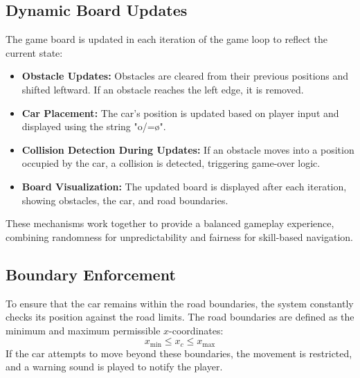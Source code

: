 \documentclass[conference]{IEEEtran}
\begin{document}
\subsection{Dynamic Board Updates}  
The game board is updated in each iteration of the game loop to reflect the current state:  

\begin{itemize}  
    \item \textbf{Obstacle Updates:} Obstacles are cleared from their previous positions and shifted leftward. If an obstacle reaches the left edge, it is removed.  
    \item \textbf{Car Placement:} The car's position is updated based on player input and displayed using the string "o/=\o".  
    \item \textbf{Collision Detection During Updates:} If an obstacle moves into a position occupied by the car, a collision is detected, triggering game-over logic.  
    \item \textbf{Board Visualization:} The updated board is displayed after each iteration, showing obstacles, the car, and road boundaries.  
\end{itemize}  

These mechanisms work together to provide a balanced gameplay experience, combining randomness for unpredictability and fairness for skill-based navigation.  


\subsection{Boundary Enforcement}
To ensure that the car remains within the road boundaries, the system constantly checks its position against the road limits. The road boundaries are defined as the minimum and maximum permissible $x$-coordinates:
\begin{equation}
x_{\text{min}} \leq x_c \leq x_{\text{max}}
\end{equation}
If the car attempts to move beyond these boundaries, the movement is restricted, and a warning sound is played to notify the player.
\end{document}
